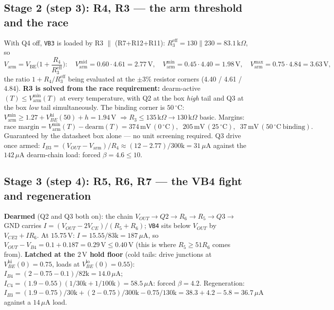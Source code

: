 \documentclass[11pt]{article}
\newcommand{\volt}{\mathrm{V}}\newcommand{\ampere}{\mathrm{A}}
\newcommand{\ohm}{\Omega}
\newcommand{\kilo}{\mathrm{k}}\newcommand{\milli}{\mathrm{m}}
\newcommand{\celsius}{{}^{\circ}\mathrm{C}}\newcommand{\second}{\mathrm{s}}
\newcommand{\SI}[2]{\ensuremath{#1\,#2}}
\newcommand{\Vbe}{V_{\mathrm{BE}}}
\newcommand{\Vout}{V_{OUT}}
\newcommand{\Varm}{V_{\mathrm{arm}}}
\newcommand{\uA}{\,\mu\mathrm{A}}
\newcommand{\vlo}{V_{BE}^{\mathrm{lo}}}
\newcommand{\vhi}{V_{BE}^{\mathrm{hi}}}
\begin{document}
\subsection{Stage 2 (step 3): R4, R3 --- the arm threshold and the race}

With Q4 off, \texttt{VB3} is loaded by R3 $\|$ (R7+R12+R11):
$R_3^{\mathrm{eff}}=130\|230=\SI{83.1}{\kilo\ohm}$, so
\begin{equation}
\Varm=\Vbe\Big(1+\frac{R_4}{R_3^{\mathrm{eff}}}\Big):\quad
\Varm^{\mathrm{mid}}=0.60\cdot4.61=\SI{2.77}{\volt},\quad
\Varm^{\min}=0.45\cdot4.40=\SI{1.98}{\volt},\quad
\Varm^{\max}=0.75\cdot4.84=\SI{3.63}{\volt},
\end{equation}
the ratio $1+R_4/R_3^{\mathrm{eff}}$ being evaluated at the $\pm3\%$ resistor
corners (4.40 / 4.61 / 4.84).
\textbf{R3 is solved from the race requirement:} dearm-active$(T)\le\Varm^{\min}(T)$
at every temperature, with Q2 at the box \emph{high} tail and Q3 at the box
\emph{low} tail simultaneously. The binding corner is \SI{50}{\celsius}:
$\Varm^{\min}\ge1.27+\vhi(50)+h=\SI{1.94}{\volt}$
$\Rightarrow R_3\le\SI{135}{\kilo\ohm}\to\SI{130}{\kilo\ohm}$ basic. Margins:
\[
\text{race margin}=\Varm^{\min}(T)-\text{dearm}(T)=
\SI{374}{\milli\volt}\,(0\,\celsius),\;\;
\SI{205}{\milli\volt}\,(25\,\celsius),\;\;
\SI{37}{\milli\volt}\,(50\,\celsius\ \text{binding}).
\]
Guaranteed by the datasheet box alone --- no unit screening required. Q3 drive
once armed: $I_{B3}=(\Vout-\Varm)/R_4\approx(12-2.77)/300\mathrm{k}=31\uA$
against the $142\uA$ dearm-chain load: forced $\beta=4.6\le10$.

\subsection{Stage 3 (step 4): R5, R6, R7 --- the VB4 fight and regeneration}

\textbf{Dearmed} (Q2 and Q3 both on): the chain
$\Vout\to Q2\to R_6\to R_5\to Q3\to$GND carries
$I=(\Vout-2V_{CE})/(R_5{+}R_6)$; \texttt{VB4} sits below $\Vout$ by
$V_{CE2}+I R_6$. At \SI{15.75}{\volt}: $I=15.55/83\mathrm{k}=187\uA$, so
$\Vout-V_{B4}=0.1+0.187=\SI{0.29}{\volt}\le\SI{0.40}{\volt}$ \checkmark
(this is where $R_5\ge51R_6$ comes from).
\textbf{Latched at the \SI{2}{\volt} hold floor} (cold tails: drive junctions
at $\vhi(0)=0.75$, loads at $\vlo(0)=0.55$):
$I_{B4}=(2-0.75-0.1)/82\mathrm{k}=14.0\uA$;
$I_{C4}=(1.9-0.55)(1/30\mathrm{k}+1/100\mathrm{k})=58.5\uA$: forced
$\beta=4.2$. Regeneration:
$I_{B3}=(1.9{-}0.75)/30\mathrm{k}+(2{-}0.75)/300\mathrm{k}-0.75/130\mathrm{k}
=38.3{+}4.2{-}5.8=36.7\uA$ against a $14\uA$ load.
\end{document}
